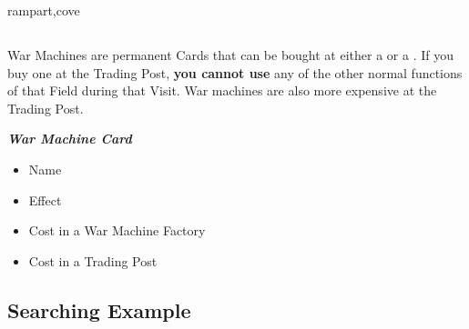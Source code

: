 \begin{multicols*}{2}
\clearpage

\begin{expansion}{rampart,cove}
  \subsection*{}

  War Machines are permanent Cards that can be bought at either a  or a .
  If you buy one at the Trading Post, \textbf{you cannot use} any of the other normal functions of that Field during that Visit.
  War machines are also more expensive at the Trading Post.

  {
    \bigskip
    \centering
    \begin{scriptsize}
    \end{scriptsize}

    \footnotesize
    \textbf{\textit{\textcolor{darkcandyapplered}{War Machine Card}}}
    \begin{itemize}[itemsep=0pt, parsep=5pt, topsep=0pt, partopsep=0pt]
      \item[\textbf{1.}] Name
      \item[\textbf{2.}] Effect
      \item[\textbf{3.}] Cost in a War Machine Factory
      \item[\textbf{4.}] Cost in a Trading Post
    \end{itemize}
  }
\end{expansion}

\columnbreak

\vspace*{\fill}
{}

\subsection*{Searching Example}


\end{multicols*}
